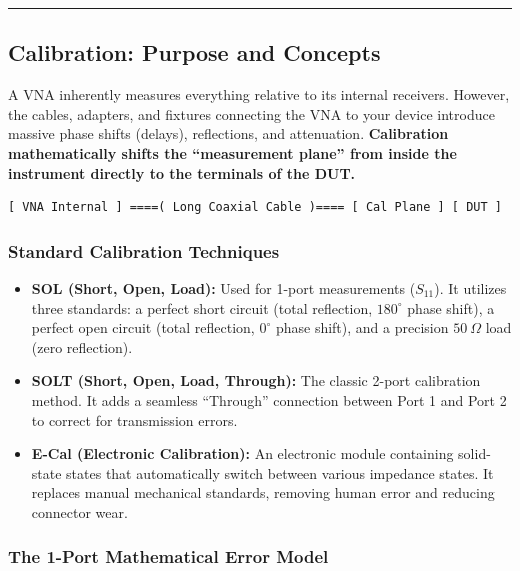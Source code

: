 \documentclass[
]{article}
\providecommand{\tightlist}{%
  \setlength{\itemsep}{0pt}\setlength{\parskip}{0pt}}
\begin{document}
\begin{center}\rule{0.5\linewidth}{0.5pt}\end{center}

\subsection{Calibration: Purpose and
Concepts}\label{calibration-purpose-and-concepts}

A VNA inherently measures everything relative to its internal receivers.
However, the cables, adapters, and fixtures connecting the VNA to your
device introduce massive phase shifts (delays), reflections, and
attenuation. \textbf{Calibration mathematically shifts the ``measurement
plane'' from inside the instrument directly to the terminals of the
DUT.}

\begin{verbatim}
[ VNA Internal ] ====( Long Coaxial Cable )==== [ Cal Plane ] [ DUT ]
\end{verbatim}

\subsubsection{Standard Calibration
Techniques}\label{standard-calibration-techniques}

\begin{itemize}
\tightlist
\item
  \textbf{SOL (Short, Open, Load):} Used for 1-port measurements
  (\(S_{11}\)). It utilizes three standards: a perfect short circuit
  (total reflection, \(180^\circ\) phase shift), a perfect open circuit
  (total reflection, \(0^\circ\) phase shift), and a precision
  \(50\ \Omega\) load (zero reflection).
\item
  \textbf{SOLT (Short, Open, Load, Through):} The classic 2-port
  calibration method. It adds a seamless ``Through'' connection between
  Port 1 and Port 2 to correct for transmission errors.
\item
  \textbf{E-Cal (Electronic Calibration):} An electronic module
  containing solid-state states that automatically switch between
  various impedance states. It replaces manual mechanical standards,
  removing human error and reducing connector wear.
\end{itemize}

\subsubsection{The 1-Port Mathematical Error
Model}\label{the-1-port-mathematical-error-model}
\end{document}
